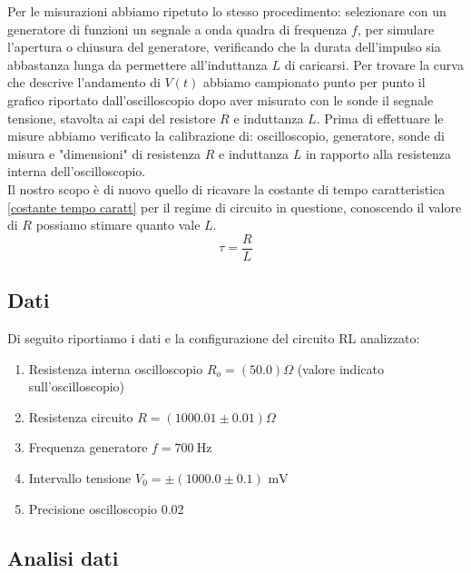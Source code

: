 \documentclass[letterpaper,12pt]{article}
\begin{document}
Per le misurazioni abbiamo ripetuto lo stesso procedimento: selezionare con un generatore di funzioni un segnale a onda quadra di frequenza $f$, per simulare l'apertura o chiusura del generatore, verificando che la durata dell'impulso sia abbastanza lunga da permettere all'induttanza $L$ di caricarsi.
 Per trovare la curva che descrive l'andamento di $V(t)$ abbiamo campionato punto per punto il grafico riportato dall'oscilloscopio dopo aver misurato con le sonde il segnale tensione, stavolta ai capi del resistore $R$ e induttanza $L$. Prima di effettuare le misure abbiamo verificato la calibrazione di: oscilloscopio, generatore, sonde di misura e "dimensioni" di resistenza $R$ e induttanza $L$ in rapporto alla resistenza interna dell'oscilloscopio.\\
Il nostro scopo è di nuovo quello di ricavare la costante di tempo caratteristica \ref{costante tempo caratt} per il regime di circuito in questione, conoscendo il valore di $R$ possiamo stimare quanto vale $L$. 
\begin{equation}
    \tau = \frac{R}{L}
    \label{costante tempo caratt}
\end{equation}
\subsection{Dati} %
Di seguito riportiamo i dati e la configurazione del circuito RL analizzato:
\begin{enumerate}[itemsep=1pt]
    \item Resistenza interna oscilloscopio $R_o = (50.0)\Omega$ (valore indicato sull'oscilloscopio)
    \item Resistenza circuito $R = (1000.01\pm0.01)\Omega$ %
    \item Frequenza generatore $f = \SI{700}{\hertz}$
    \item Intervallo tensione $V_0= \pm (1000.0\pm0.1)\text{ mV}$
    \item Precisione oscilloscopio 	0.02
\end{enumerate}

\subsection{Analisi dati}
\end{document}
